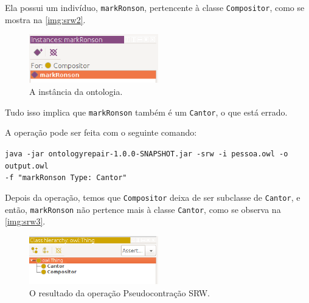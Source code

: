 Ela possui um indivíduo, \texttt{markRonson}, pertencente à classe \texttt{Compositor}, como se mostra na \autoref{img:srw2}.

\begin{figure}[H]
	\centering
	\includegraphics[width=0.5\textwidth]{Capitulos/Implementacao/srw2.png}
	\caption{A instância da ontologia.}
	\label{img:srw2}
\end{figure}

Tudo isso implica que \texttt{markRonson} também é um \texttt{Cantor}, o que está errado. 

A operação pode ser feita com o seguinte comando:

\begin{small}
	\texttt{java -jar ontologyrepair-1.0.0-SNAPSHOT.jar -srw -i pessoa.owl -o output.owl \\ -f "markRonson Type: Cantor"}
\end{small}

Depois da operação, temos que \texttt{Compositor} deixa de ser subclasse de \texttt{Cantor}, e então, \texttt{markRonson} não pertence mais à classe \texttt{Cantor}, como se observa na \autoref{img:srw3}.

\begin{figure}[H]
	\centering
	\includegraphics[width=0.5\textwidth]{Capitulos/Implementacao/srw3.png}
	\caption{O resultado da operação Pseudocontração SRW.}
	\label{img:srw3}
\end{figure}
